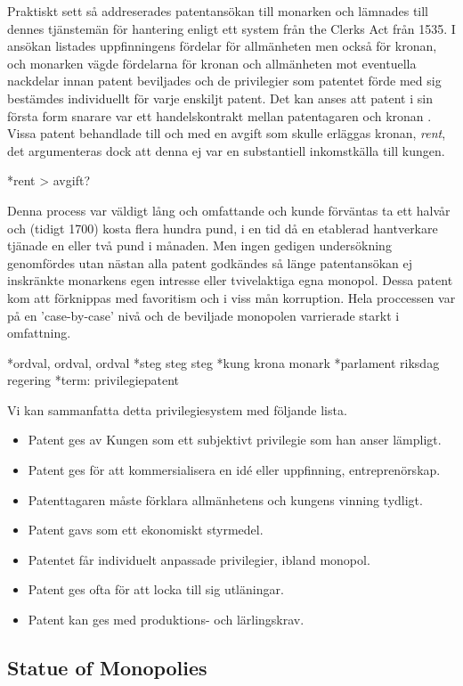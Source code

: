 Praktiskt sett så addreserades patentansökan till monarken och lämnades till dennes tjänstemän för hantering enligt ett
system från the Clerks Act från 1535\cite{bracha}. I ansökan listades uppfinningens fördelar för allmänheten men också
för kronan, och monarken vägde fördelarna för kronan och allmänheten mot eventuella nackdelar innan patent
beviljades och de privilegier som patentet förde med sig bestämdes individuellt för varje enskiljt patent. Det kan anses att patent i sin första form snarare var ett handelskontrakt mellan patentagaren och kronan
\cite{bracha}. Vissa patent behandlade till och med en avgift som skulle erläggas kronan, \emph{rent},
det argumenteras dock att denna ej var en substantiell inkomstkälla till kungen. \cite{macleod2}

*rent > avgift?

Denna process var väldigt lång och omfattande och kunde
förväntas ta ett halvår och (tidigt 1700) kosta flera hundra pund, i en tid då en etablerad hantverkare tjänade en eller två pund i månaden. \cite{macleod}
Men ingen gedigen undersökning genomfördes utan nästan alla patent godkändes så
länge patentansökan ej inskränkte monarkens egen intresse eller tvivelaktiga egna monopol. 
Dessa patent kom att förknippas med favoritism och i viss mån korruption. Hela proccessen var på en
'case-by-case' nivå och de beviljade monopolen varrierade starkt i omfattning\cite{bracha}.

*ordval, ordval, ordval
*steg steg steg
*kung krona monark
*parlament riksdag regering
*term: privilegiepatent

Vi kan sammanfatta detta privilegiesystem med följande lista.
\begin{itemize}
	\item Patent ges av Kungen som ett subjektivt privilegie som han anser lämpligt.
	\item Patent ges för att kommersialisera en idé eller uppfinning, entreprenörskap.
	\item Patenttagaren måste förklara allmänhetens och kungens vinning tydligt.
	\item Patent gavs som ett ekonomiskt styrmedel.
	\item Patentet får individuelt anpassade privilegier, ibland monopol.
	\item Patent ges ofta för att locka till sig utläningar.
	\item Patent kan ges med produktions- och lärlingskrav.
\end{itemize}


\subsection{Statue of Monopolies} 
\label{sub:statue_of_monopolies}

